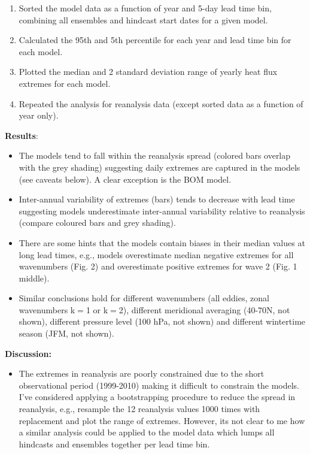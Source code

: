 \documentclass[12pt]{article}
\begin{document}
\begin{spacing}{1}
\begin{enumerate}
\item Sorted the model data as a function of year and 5-day lead time bin, combining all ensembles and hindcast start dates for a given model.

\item Calculated the 95th and 5th percentile for each year and lead time bin for each model.

\item Plotted the median and 2 standard deviation range of yearly heat flux extremes for each model.

\item Repeated the analysis for reanalysis data (except sorted data as a function of year only).


\end{enumerate}


{\bf Results}:

\begin{itemize}

\item The models tend to fall within the reanalysis spread (colored bars overlap with the grey shading) suggesting daily extremes are captured in the models (see caveats below). A clear exception is the BOM model. 

\item Inter-annual variability of extremes (bars) tends to decrease with lead time suggesting models underestimate inter-annual variability relative to reanalysis (compare coloured bars and grey shading).

\item There are some hints that the models contain biases in their median values at long lead times, e.g., models overestimate median negative extremes for all wavenumbers (Fig. 2) and overestimate positive extremes for wave 2 (Fig. 1 middle).  

\item Similar conclusions hold for different wavenumbers (all eddies, zonal wavenumbers k$=$1 or k$=$2), different meridional averaging (40-70N, not shown), different pressure level (100 hPa, not shown) and different wintertime season (JFM, not shown). 

\end{itemize}


{\bf Discussion:}

\begin{itemize}

\item The extremes in reanalysis are poorly constrained due to the short observational period (1999-2010) making it difficult to constrain the models. I've considered applying a bootstrapping procedure to reduce the spread in reanalysis, e.g., resample the 12 reanalysis values 1000 times with replacement and plot the range of extremes. However, its not clear to me how a similar analysis could be applied to the model data which lumps all hindcasts and ensembles together per lead time bin.  


\end{itemize}
\end{spacing}
\end{document}
